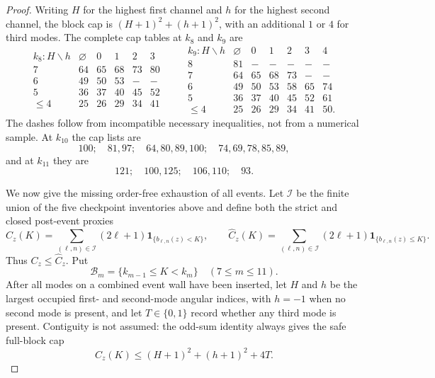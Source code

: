 \documentclass[11pt]{article}
\numberwithin{equation}{section}
\theoremstyle{definition}
\theoremstyle{remark}
\begin{document}
\begin{proof}
Writing \(H\) for the highest first channel and \(h\) for the highest
second channel, the block cap is \((H+1)^2+(h+1)^2\), with an additional
\(1\) or \(4\) for third modes.  The complete cap tables at \(k_8\) and
\(k_9\) are
\[
\begin{array}{c|ccccc}
k_8:H\backslash h&\varnothing&0&1&2&3\\ \hline
7&64&65&68&73&80\\
6&49&50&53&-&-\\
5&36&37&40&45&52\\
\leq4&25&26&29&34&41
\end{array}
\qquad
\begin{array}{c|cccccc}
k_9:H\backslash h&\varnothing&0&1&2&3&4\\ \hline
8&81&-&-&-&-&-\\
7&64&65&68&73&-&-\\
6&49&50&53&58&65&74\\
5&36&37&40&45&52&61\\
\leq4&25&26&29&34&41&50.
\end{array}
\]
The dashes follow from incompatible necessary inequalities, not from a
numerical sample.  At \(k_{10}\) the cap lists are
\[
 100;\quad81,97;\quad64,80,89,100;\quad74,69,78,85,89,
\]
and at \(k_{11}\) they are
\[
 121;\quad100,125;\quad106,110;\quad93.
\]

We now give the missing order-free exhaustion of all events.  Let
\(\mathcal I\) be the finite union of the five checkpoint inventories above
and define both the strict and closed post-event proxies
\[
 C_z(K)=\sum_{(\ell,n)\in\mathcal I}(2\ell+1)
 \mathbf1_{\{b_{\ell,n}(z)<K\}},\qquad
 \widehat C_z(K)=\sum_{(\ell,n)\in\mathcal I}(2\ell+1)
 \mathbf1_{\{b_{\ell,n}(z)\leq K\}}.
\]
Thus \(C_z\leq\widehat C_z\).  Put
\[
 \mathcal B_m=\{k_{m-1}\leq K<k_m\}\quad(7\leq m\leq11).
\]
After all modes on a combined event wall have been inserted, let \(H\) and
\(h\) be the largest occupied first- and second-mode angular indices, with
\(h=-1\) when no second mode is present, and let \(T\in\{0,1\}\) record
whether any third mode is present.  Contiguity is not assumed: the odd-sum
identity always gives the safe full-block cap
\begin{equation}
 \widehat C_z(K)\leq (H+1)^2+(h+1)^2+4T.
 \label{cm:eq-closed-post-event-cap}
\end{equation}


\end{proof}
\end{document}
